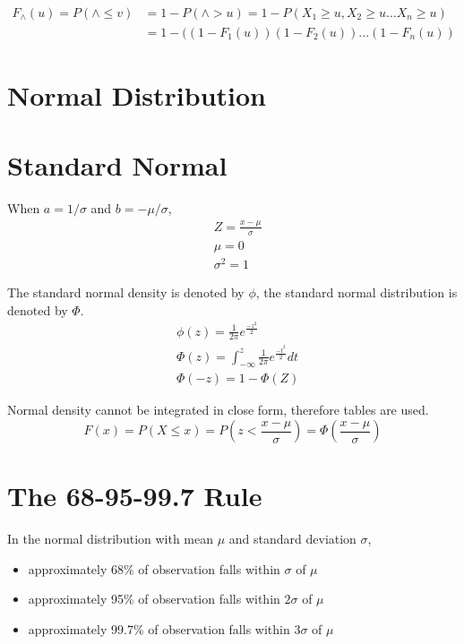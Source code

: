 \documentclass{article}
\begin{document}
    \begin{align*}
            F_{\wedge}(u) = P(\wedge \leq v) &= 1 - P(\wedge > u) = 1- P(X_{1}\geq u, X_{2} \geq u \dots X_{n} \geq u )\\
        &= 1- ((1-F_{1}(u))(1-F_{2}(u))...(1-F_{n}(u))
    \end{align*}
    
    \section{Normal Distribution}
        \section*{Standard Normal}
    When $a = 1/\sigma$ and $b = -\mu / \sigma$, 
    \begin{align*}
            &Z = \frac{x-\mu}{\sigma}\\
            &\mu = 0\\
            &\sigma^{2} = 1
    \end{align*}

    The standard normal density is denoted by $\phi$, the standard normal distribution is denoted by $\Phi$.
    \begin{align*}
            &\phi(z) = \frac{1}{2\pi} e^{\frac{-z^{2}}{2}}\\
            &\Phi(z) = \int_{-\infty}^{z} \frac{1}{2 \pi } e^{\frac{-t^{2}}{2}} dt\\
            &\Phi(-z) = 1 - \Phi (Z)
    \end{align*}

    Normal density cannot be integrated in close form, therefore tables are used. 
    \begin{equation*}
        F(x) = P(X \leq x) = P(z < \frac{x-\mu}{\sigma}) = \Phi(\frac{x-\mu}{\sigma})
    \end{equation*}
    \section*{The 68-95-99.7 Rule}
    In the normal distribution with mean $\mu$ and standard deviation $\sigma$,
    \begin{itemize}
        \item approximately 68\% of observation falls within $\sigma$ of $\mu$
        \item approximately 95\% of observation falls within $2\sigma$ of $\mu$
        \item approximately 99.7\% of observation falls within $3\sigma$ of $\mu$
    \end{itemize}
    
\end{document}
